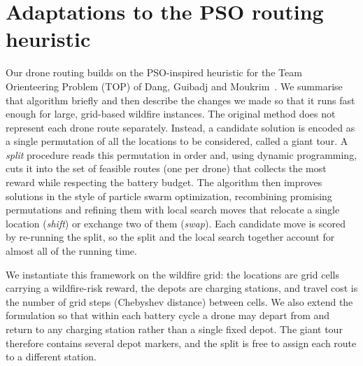 \section{Adaptations to the PSO routing heuristic}
\label{app:pso}

Our drone routing builds on the PSO-inspired heuristic for the Team Orienteering
Problem (TOP) of Dang, Guibadj and Moukrim~\cite{PSO}. We summarise that algorithm
briefly and then describe the changes we made so that it runs fast enough for
large, grid-based wildfire instances. The original method does not represent each
drone route separately. Instead, a candidate solution is encoded as a single
permutation of all the locations to be considered, called a giant tour. A
\emph{split} procedure reads this permutation in order and, using dynamic
programming, cuts it into the set of feasible routes (one per drone) that collects
the most reward while respecting the battery budget. The algorithm then improves
solutions in the style of particle swarm optimization, recombining promising
permutations and refining them with local search moves that relocate a single
location (\emph{shift}) or exchange two of them (\emph{swap}). Each candidate move
is scored by re-running the split, so the split and the local search together
account for almost all of the running time.

We instantiate this framework on the wildfire grid: the locations are grid cells
carrying a wildfire-risk reward, the depots are charging stations, and travel cost
is the number of grid steps (Chebyshev distance) between cells. We also extend the
formulation so that within each battery cycle a drone may depart from and return to
any charging station rather than a single fixed depot. The giant tour therefore
contains several depot markers, and the split is free to assign each route to a
different station.

